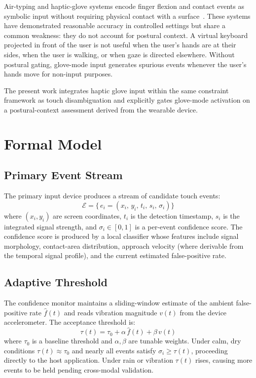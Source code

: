 \documentclass[11pt,letterpaper]{article}
\begin{document}
Air-typing and haptic-glove systems encode finger flexion and contact events as
symbolic input without requiring physical contact with a surface~\cite{airtype}.
These systems have demonstrated reasonable accuracy in controlled settings but
share a common weakness: they do not account for postural context. A virtual
keyboard projected in front of the user is not useful when the user's hands are
at their sides, when the user is walking, or when gaze is directed elsewhere.
Without postural gating, glove-mode input generates spurious events whenever
the user's hands move for non-input purposes.

The present work integrates haptic glove input within the same constraint framework
as touch disambiguation and explicitly gates glove-mode activation on a
postural-context assessment derived from the wearable device.

\section{Formal Model}
\label{sec:model}

\subsection{Primary Event Stream}

The primary input device produces a stream of candidate touch events:
\[
  \mathcal{E} = \bigl\{\, e_i = (x_i,\, y_i,\, t_i,\, s_i,\, \sigma_i) \bigr\}
\]
where $(x_i, y_i)$ are screen coordinates, $t_i$ is the detection timestamp,
$s_i$ is the integrated signal strength, and $\sigma_i \in [0,1]$ is a
per-event confidence score. The confidence score is produced by a local classifier
whose features include signal morphology, contact-area distribution, approach
velocity (where derivable from the temporal signal profile), and the current
estimated false-positive rate.

\subsection{Adaptive Threshold}

The confidence monitor maintains a sliding-window estimate of the ambient
false-positive rate $\hat{f}(t)$ and reads vibration magnitude $v(t)$ from the
device accelerometer. The acceptance threshold is:
\begin{equation}
  \tau(t) = \tau_0 + \alpha\,\hat{f}(t) + \beta\,v(t)
  \label{eq:threshold}
\end{equation}
where $\tau_0$ is a baseline threshold and $\alpha, \beta$ are tunable weights.
Under calm, dry conditions $\tau(t) \approx \tau_0$ and nearly all events satisfy
$\sigma_i \geq \tau(t)$, proceeding directly to the host application. Under rain
or vibration $\tau(t)$ rises, causing more events to be held pending cross-modal
validation.
\end{document}
